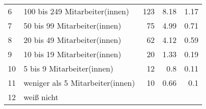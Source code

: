 \begin{longtable}{lXrrr}
     6 &
     \multicolumn{1}{X}{ 100 bis 249 Mitarbeiter(innen)   } &


       \num{123} &
       \num[round-mode=places,round-precision=2]{8,18} &
         \num[round-mode=places,round-precision=2]{1,17} \\

     7 &
     \multicolumn{1}{X}{ 50 bis 99 Mitarbeiter(innen)   } &


       \num{75} &
       \num[round-mode=places,round-precision=2]{4,99} &
         \num[round-mode=places,round-precision=2]{0,71} \\

     8 &
     \multicolumn{1}{X}{ 20 bis 49 Mitarbeiter(innen)   } &


       \num{62} &
       \num[round-mode=places,round-precision=2]{4,12} &
         \num[round-mode=places,round-precision=2]{0,59} \\

     9 &
     \multicolumn{1}{X}{ 10 bis 19 Mitarbeiter(innen)   } &


       \num{20} &
       \num[round-mode=places,round-precision=2]{1,33} &
         \num[round-mode=places,round-precision=2]{0,19} \\

     10 &
     \multicolumn{1}{X}{ 5 bis 9 Mitarbeiter(innen)   } &


       \num{12} &
       \num[round-mode=places,round-precision=2]{0,8} &
         \num[round-mode=places,round-precision=2]{0,11} \\

     11 &
     \multicolumn{1}{X}{ weniger als 5 Mitarbeiter(innen)   } &


       \num{10} &
       \num[round-mode=places,round-precision=2]{0,66} &
         \num[round-mode=places,round-precision=2]{0,1} \\

     12 &
     \multicolumn{1}{X}{ weiß nicht   } &



\end{longtable}
